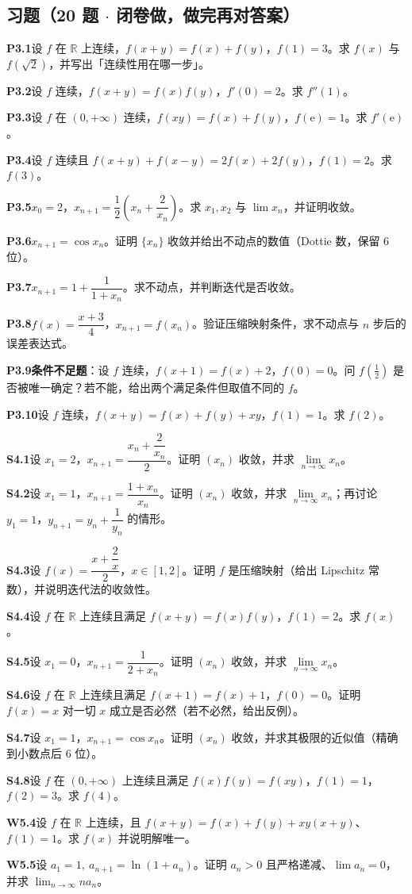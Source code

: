 \documentclass[11pt,a4paper]{ctexart}
\newcommand{\R}{\mathbb{R}}
\newcommand{\ee}{\mathrm{e}}
\newcommand{\q}[2]{\par\medskip\noindent\textbf{#1}\quad #2\par}
\begin{document}
\subsection{习题（20 题 $\cdot$ 闭卷做，做完再对答案）}
\q{P3.1}{设 $f$ 在 $\R$ 上连续，$f(x+y)=f(x)+f(y)$，$f(1)=3$。求 $f(x)$ 与 $f(\sqrt{2})$，并写出「连续性用在哪一步」。}
\q{P3.2}{设 $f$ 连续，$f(x+y)=f(x)f(y)$，$f'(0)=2$。求 $f''(1)$。}
\q{P3.3}{设 $f$ 在 $(0,+\infty)$ 连续，$f(xy)=f(x)+f(y)$，$f(\ee)=1$。求 $f'(\ee)$。}
\q{P3.4}{设 $f$ 连续且 $f(x+y)+f(x-y)=2f(x)+2f(y)$，$f(1)=2$。求 $f(3)$。}
\q{P3.5}{$x_{0}=2$，$x_{n+1}=\dfrac{1}{2}\left(x_{n}+\dfrac{2}{x_{n}}\right)$。求 $x_{1},x_{2}$ 与 $\lim x_{n}$，并证明收敛。}
\q{P3.6}{$x_{n+1}=\cos x_{n}$。证明 $\{x_{n}\}$ 收敛并给出不动点的数值（Dottie 数，保留 6 位）。}
\q{P3.7}{$x_{n+1}=1+\dfrac{1}{1+x_{n}}$。求不动点，并判断迭代是否收敛。}
\q{P3.8}{$f(x)=\dfrac{x+3}{4}$，$x_{n+1}=f(x_{n})$。验证压缩映射条件，求不动点与 $n$ 步后的误差表达式。}
\q{P3.9}{\textbf{条件不足题}：设 $f$ 连续，$f(x+1)=f(x)+2$，$f(0)=0$。问 $f\left(\frac{1}{2}\right)$ 是否被唯一确定？若不能，给出两个满足条件但取值不同的 $f$。}
\q{P3.10}{设 $f$ 连续，$f(x+y)=f(x)+f(y)+xy$，$f(1)=1$。求 $f(2)$。}
\q{S4.1}{设 $x_{1}=2$，$x_{n+1}=\dfrac{x_{n}+\dfrac{2}{x_{n}}}{2}$。证明 $(x_{n})$ 收敛，并求 $\lim\limits_{n\to\infty}x_{n}$。}
\q{S4.2}{设 $x_{1}=1$，$x_{n+1}=\dfrac{1+x_{n}}{x_{n}}$。证明 $(x_{n})$ 收敛，并求 $\lim\limits_{n\to\infty}x_{n}$；再讨论 $y_{1}=1$，$y_{n+1}=y_{n}+\dfrac{1}{y_{n}}$ 的情形。}
\q{S4.3}{设 $f(x)=\dfrac{x+\dfrac{2}{x}}{2}$，$x\in[1,2]$。证明 $f$ 是压缩映射（给出 Lipschitz 常数），并说明迭代法的收敛性。}
\q{S4.4}{设 $f$ 在 $\R$ 上连续且满足 $f(x+y)=f(x)f(y)$，$f(1)=2$。求 $f(x)$。}
\q{S4.5}{设 $x_{1}=0$，$x_{n+1}=\dfrac{1}{2+x_{n}}$。证明 $(x_{n})$ 收敛，并求 $\lim\limits_{n\to\infty}x_{n}$。}
\q{S4.6}{设 $f$ 在 $\R$ 上连续且满足 $f(x+1)=f(x)+1$，$f(0)=0$。证明 $f(x)=x$ 对一切 $x$ 成立是否必然（若不必然，给出反例）。}
\q{S4.7}{设 $x_{1}=1$，$x_{n+1}=\cos x_{n}$。证明 $(x_{n})$ 收敛，并求其极限的近似值（精确到小数点后 6 位）。}
\q{S4.8}{设 $f$ 在 $(0,+\infty)$ 上连续且满足 $f(x)f(y)=f(xy)$，$f(1)=1$，$f(2)=3$。求 $f(4)$。}
\q{W5.4}{设 $f$ 在 $\R$ 上连续，且 $f(x+y)=f(x)+f(y)+xy(x+y)$、$f(1)=1$。求 $f(x)$ 并说明解唯一。\quad{\footnotesize\color{blue!45!black}[对标 2024-25 Q18 抽象函数方程]}}
\q{W5.5}{设 $a_1=1,\ a_{n+1}=\ln(1+a_n)$。证明 $a_n>0$ 且严格递减、$\lim a_n=0$，并求 $\lim_{n\to\infty}n a_n$。\quad{\footnotesize\color{blue!45!black}[对标交大卷 Q4 + 册三 P3 迭代]}}
\end{document}
